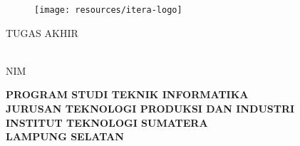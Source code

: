 \clearpage
\pagestyle{empty}

\begin{center}
\smallskip

    \begin{figure}[h]
    	\centering
    	\texttt{[image: resources/itera-logo]}
    \end{figure}

	\Large \bfseries \MakeUppercase{\thetitle}
	\vfill

    \Large \uppercase{Tugas Akhir}
    \vfill

    \normalsize \normalfont \theauthor\\
    NIM \printnim
    \vfill

    \large \bfseries
    \uppercase{
        Program Studi Teknik Informatika \\
        Jurusan Teknologi Produksi dan Industri\\
        Institut Teknologi Sumatera\\
        Lampung Selatan
    }\medskip

    \thedate

\end{center}

\clearpage
